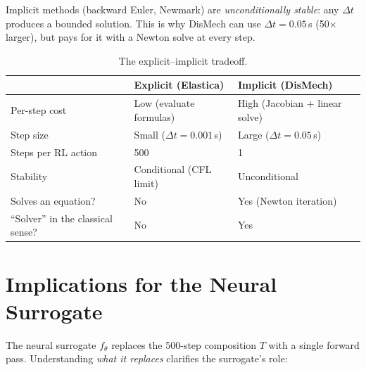 \documentclass[11pt]{article}
\begin{document}
Implicit methods (backward Euler, Newmark) are \emph{unconditionally stable}: any $\Delta t$ produces a bounded solution.
This is why DisMech can use $\Delta t = 0.05$\,s (50$\times$ larger), but pays for it with a Newton solve at every step.

\begin{table}[H]
\centering
\caption{The explicit--implicit tradeoff.}
\label{tab:tradeoff}
\renewcommand{\arraystretch}{1.3}
\begin{tabular}{@{}lll@{}}
\toprule
& \textbf{Explicit (Elastica)} & \textbf{Implicit (DisMech)} \\
\midrule
Per-step cost & Low (evaluate formulas) & High (Jacobian + linear solve) \\
Step size & Small ($\Delta t = 0.001$\,s) & Large ($\Delta t = 0.05$\,s) \\
Steps per RL action & 500 & 1 \\
Stability & Conditional (CFL limit) & Unconditional \\
Solves an equation? & No & Yes (Newton iteration) \\
``Solver'' in the classical sense? & No & Yes \\
\bottomrule
\end{tabular}
\end{table}

\section{Implications for the Neural Surrogate}
\label{sec:surrogate}

The neural surrogate $f_\theta$ replaces the 500-step composition $T$ with a single forward pass.
Understanding \emph{what it replaces} clarifies the surrogate's role:
\end{document}
